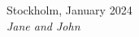 

\lipsum[8-9] %

\vspace{2em}

\noindent Stockholm, January 2024 \\
\noindent \textit{Jane and John}